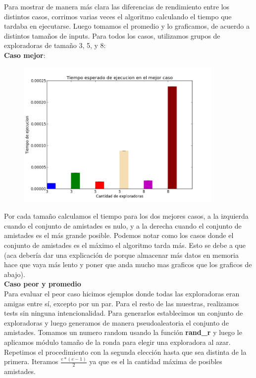 \documentclass[11pt]{article}
\begin{document}
Para mostrar de manera más clara las diferencias de rendimiento entre los distintos casos, corrimos varias veces 
el algoritmo calculando el tiempo que tardaba en ejecutarse. Luego tomamos el promedio y lo graficamos, de acuerdo a distintos tamaños de inputs.
Para todos los casos, utilizamos grupos de exploradoras de tamaño 3, 5, y 8: \\

\textbf{Caso mejor}:

      \begin{figure}[h]
        \begin{center}
        \includegraphics[width=100mm,scale=0.5]{mejorCaso}
        \end{center}
        \end{figure}

Por cada tamaño calculamos el tiempo para los dos mejores casos, a la izquierda cuando el conjunto de amistades es 
nulo, y a la derecha cuando el conjunto de amistades es el más grande posible.
Podemos notar como los casos donde el conjunto de amistades es el máximo el algoritmo tarda más. Esto se debe a que 
(aca debería dar una explicación de porque almacenar más datos en memoria hace que vaya más lento y poner que anda mucho mas graficos que los graficos de abajo).
\\

\textbf{Caso peor y promedio} \\

Para evaluar el peor caso hicimos ejemplos donde todas las exploradoras eran amigas entre sí, excepto por un par. 
Para el resto de las muestras, realizamos tests sin ninguna intencionalidad. Para generarlos establecimos un conjunto de 
exploradoras y luego generamos de manera pseudoaleatoria el conjunto de amistades. Tomamos un numero random 
usando la función \textbf{rand\_r} y luego le aplicamos módulo tamaño de la ronda para elegir una exploradora al azar. 
Repetimos el procedimiento con la segunda elección hasta que sea distinta de la primera. Iteramos $\frac{e*(e-1)}{2}$
ya que es el la cantidad máxima de posibles amistades.
\end{document}
